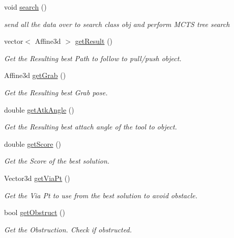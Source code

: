 \begin{DoxyCompactItemize}
void \hyperlink{classTool__Expt__2_ac9e4fdba0c08996bc46cd9e74f878383}{search} ()
\begin{DoxyCompactList}\small\item\em send all the data over to search class obj and perform M\+C\+TS tree search \end{DoxyCompactList}\item 
vector$<$ Affine3d $>$ \hyperlink{classTool__Expt__2_ae984275561905b857cf025239efc0a2c}{get\+Result} ()
\begin{DoxyCompactList}\small\item\em Get the Resulting best Path to follow to pull/push object. \end{DoxyCompactList}\item 
Affine3d \hyperlink{classTool__Expt__2_a5952622f42e4bc903c46180eb63142ee}{get\+Grab} ()
\begin{DoxyCompactList}\small\item\em Get the Resulting best Grab pose. \end{DoxyCompactList}\item 
double \hyperlink{classTool__Expt__2_a30ce22966534df289b16a55cd8a1636f}{get\+Atk\+Angle} ()
\begin{DoxyCompactList}\small\item\em Get the Resulting best attach angle of the tool to object. \end{DoxyCompactList}\item 
double \hyperlink{classTool__Expt__2_a914a228608477de677f9045fe6bf3c08}{get\+Score} ()
\begin{DoxyCompactList}\small\item\em Get the Score of the best solution. \end{DoxyCompactList}\item 
Vector3d \hyperlink{classTool__Expt__2_a9247b27356d4972cdb911120cc1920cb}{get\+Via\+Pt} ()
\begin{DoxyCompactList}\small\item\em Get the Via Pt to use from the best solution to avoid obstacle. \end{DoxyCompactList}\item 
bool \hyperlink{classTool__Expt__2_a4f325224bd61c8d68d562a02f84d90c3}{get\+Obstruct} ()
\begin{DoxyCompactList}\small\item\em Get the Obstruction. Check if obstructed. \end{DoxyCompactList}\end{DoxyCompactItemize}
